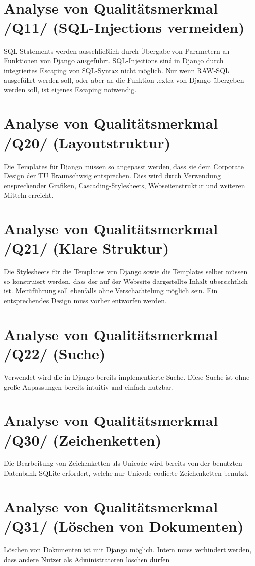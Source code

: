 \section{Analyse von Qualitätsmerkmal /Q11/ (SQL-Injections vermeiden)}

SQL-Statements werden ausschließlich durch Übergabe von Parametern an 
Funktionen von Django ausgeführt. SQL-Injections sind in Django durch 
integriertes Escaping von SQL-Syntax nicht möglich. Nur wenn RAW-SQL 
ausgeführt werden soll, oder aber an die Funktion .extra von Django 
übergeben werden soll, ist eigenes Escaping notwendig.

\section{Analyse von Qualitätsmerkmal /Q20/ (Layoutstruktur)}

Die Templates für Django müssen so angepasst werden, dass sie dem Corporate
Design der TU Braunschweig entsprechen. Dies wird durch Verwendung ensprechender
Grafiken, Cascading-Stylesheets, Webseitenstruktur und weiteren Mitteln erreicht.


\section{Analyse von Qualitätsmerkmal /Q21/ (Klare Struktur)}

Die Stylesheets für die Templates von Django sowie die Templates selber
müssen so konstruiert werden, dass der auf der Webseite dargestellte 
Inhalt übersichtlich ist. Menüführung soll ebenfalls ohne Verschachtelung
möglich sein. Ein entsprechendes Design muss vorher entworfen werden.


\section{Analyse von Qualitätsmerkmal /Q22/ (Suche)}


Verwendet wird die in Django bereits implementierte Suche. Diese Suche ist ohne
große Anpassungen bereits intuitiv und einfach nutzbar.


\section{Analyse von Qualitätsmerkmal /Q30/ (Zeichenketten)} 

Die Bearbeitung von Zeichenketten als Unicode wird bereits von der benutzten
Datenbank SQLite erfordert, welche nur Unicode-codierte Zeichenketten benutzt.


\section{Analyse von Qualitätsmerkmal /Q31/ (Löschen von Dokumenten)} 

Löschen von Dokumenten ist mit Django möglich. Intern muss verhindert werden,
dass andere Nutzer als Administratoren löschen dürfen.
